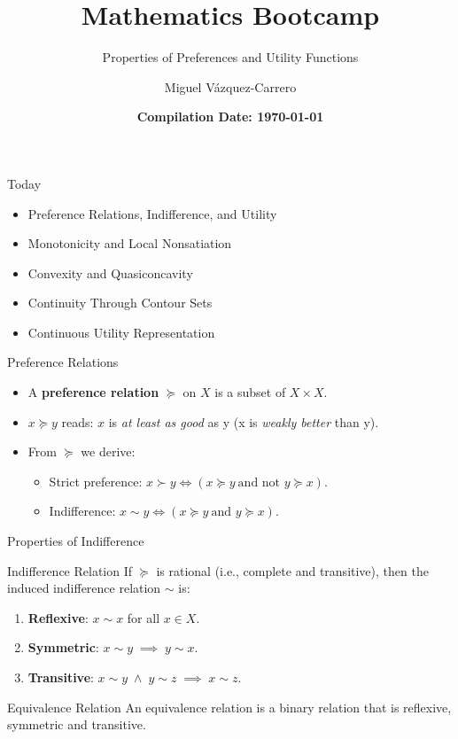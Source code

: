 \documentclass[11pt,aspectratio=169,c]{beamer}
\title{\textbf{Mathematics Bootcamp}}
\subtitle{Properties of Preferences and Utility Functions}
\author{Miguel Vázquez-Carrero}
\date{\textbf{Compilation Date: \today}}
\begin{document}
\begin{frame}
\vfill
\titlepage
\vfill
\end{frame}

\begin{frame}{Today}

\begin{itemize}
    \item Preference Relations, Indifference, and Utility
    \item Monotonicity and Local Nonsatiation
    \item Convexity and Quasiconcavity
    \item Continuity Through Contour Sets
    \item Continuous Utility Representation
\end{itemize}
    
\end{frame}

\begin{frame}{Preference Relations}
  \begin{itemize}
    \item A \textbf{preference relation} $\succeq$ on $X$ is a subset of $X\times X$.
    \item $x \succeq y$ reads: $x$ is \textit{at least as good} as y (x is \textit{weakly better} than y).
    \vspace{1em}
    \item From $\succeq$ we derive:
    \begin{itemize}
      \item Strict preference: $x \succ y \iff (x \succeq y \ \text{and not } y \succeq x)$.
      \item Indifference: $x \sim y \iff (x \succeq y \ \text{and } y \succeq x)$.
    \end{itemize}
  \end{itemize}

\end{frame}

\begin{frame}{Properties of Indifference}
  \begin{block}{Indifference Relation}
    If $\succeq$ is rational (i.e., complete and transitive), then the induced indifference relation $\sim$ is:
    \begin{enumerate}
      \item \textbf{Reflexive}: $x \sim x$ for all $x \in X$.
      \item \textbf{Symmetric}: $x \sim y \;\implies\; y \sim x$.
      \item \textbf{Transitive}: $x \sim y \;\wedge\; y \sim z \;\implies\; x \sim z$.
    \end{enumerate}
  \end{block}

    \begin{block}{Equivalence Relation}
    An equivalence relation is a binary relation that is reflexive, symmetric and transitive. \\
    \end{block}  

\end{frame}
\end{document}
